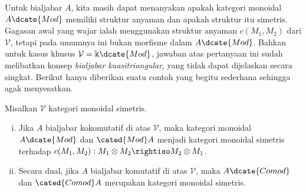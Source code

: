 
Untuk bialjabar $A$, kita masih dapat menanyakan apakah kategori monoidal
$A\dcate{Mod}$ memiliki struktur anyaman dan apakah struktur itu simetris.
Gagasan awal yang wajar ialah menggunakan struktur anyaman $c(M_1,M_2)$ dari
$\mathcal{V}$, tetapi pada umumnya ini bukan morfisme dalam $A\dcate{Mod}$.
Bahkan untuk kasus khusus $\mathcal{V}=\Bbbk\dcate{Mod}$, jawaban atas
pertanyaan ini sudah melibatkan konsep \emph{bialjabar kuasitriangular}, yang
tidak dapat dijelaskan secara singkat. Berikut hanya diberikan suatu contoh
yang begitu sederhana sehingga agak menyesatkan.

\begin{proposition}\label{prop:bialgebra-mod-symmetry}
	Misalkan $\mathcal{V}$ kategori monoidal simetris.
	\begin{enumerate}[(i)]
		\item Jika $A$ bialjabar kokomutatif di atas $\mathcal{V}$, maka kategori
		monoidal $A\dcate{Mod}$ dan $\cated{Mod}A$ menjadi kategori monoidal
		simetris terhadap
		$c(M_1,M_2):M_1\otimes M_2\rightiso M_2\otimes M_1$.

		\item Secara dual, jika $A$ bialjabar komutatif di atas $\mathcal{V}$,
		maka $A\dcate{Comod}$ dan $\cated{Comod}A$ merupakan kategori monoidal
		simetris.
	\end{enumerate}
\end{proposition}

